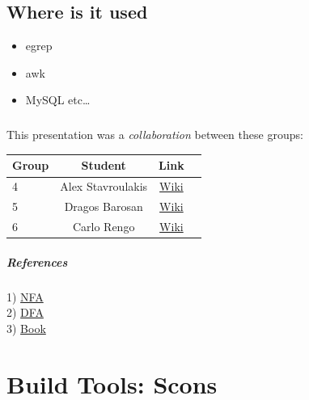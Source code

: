 \documentclass[a4paper,11pt]{report}
\begin{document}
\section{Where is it used}
\begin{itemize}
  \item egrep
  \item awk
  \item MySQL etc\ldots
\end{itemize}

\paragraph{}
This presentation was a \emph{collaboration} between these groups: \\

\begin{center}
 \begin{tabular}{| l | c | c | c |}
 \hline \textbf{Group} & \textbf{Student} & \textbf{Link} \\
 \hline 
 4 & Alex Stavroulakis & \href{https://www.os3.nl/2014-2015/students/alexandros_stavroulakis/es}{Wiki}\\
 \hline 
 5 & Dragos Barosan & \href{https://www.os3.nl/2014-2015/students/dragos_barosan/es/week2#homework_3}{Wiki} \\ 
 \hline 
 6 & Carlo Rengo & \href{https://www.os3.nl/2014-2015/students/carlo_rengo/es/homewrk_3}{Wiki} \\ 
 \hline 
 \end{tabular} 
\end{center}


\paragraph{References\\}
1) \href{http://en.wikipedia.org/wiki/Nondeterministic_finite_automaton}{NFA} \\
2) \href{http://en.wikipedia.org/wiki/Deterministic_finite_automaton}{DFA} \\
3) \href{http://dl.e-book-free.com/2013/07/mastering_regular_expressions_third_edition.pdf}{Book} \\

\chapter {Build Tools: Scons}
\end{document}
